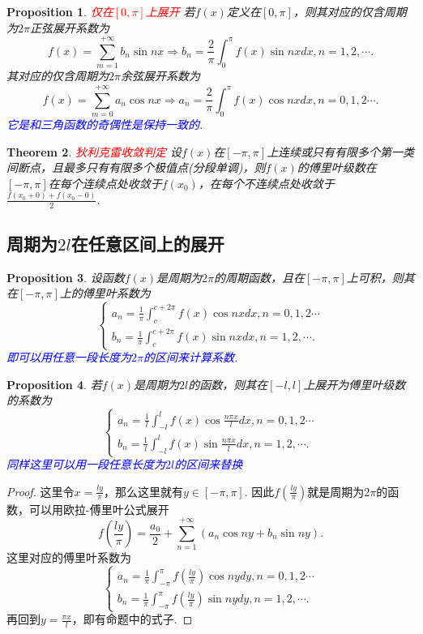 \documentclass{article}
\newtheorem{theorem}{Theorem}[section]
\newtheorem{proposition}[theorem]{Proposition}
\newcommand{\redt}[1]{\textcolor{red}{#1}}
\newcommand{\bluet}[1]{\textcolor{blue}{#1}}
\begin{document}
\begin{proposition}
\rm \redt{仅在$[0,\pi]$上展开} 若$f(x)$定义在$[0,\pi]$，则其对应的仅含周期为$2\pi$正弦展开系数为
$$
f(x) = \sum\limits_{m=1}^{+\infty}b_n\sin nx \Rightarrow b_n = \frac{2}{\pi} \int_{0}^{\pi} f(x)\sin nx dx,n = 1,2,\cdots.
$$
其对应的仅含周期为$2\pi$余弦展开系数为
$$
f(x) = \sum\limits_{m=0}^{+\infty}a_n\cos nx \Rightarrow a_n = \frac{2}{\pi} \int_{0}^{\pi} f(x)\cos nx dx, n = 0,1,2\cdots. 
$$
\bluet{它是和三角函数的奇偶性是保持一致的}.
\end{proposition}

\begin{theorem}
\rm \redt{狄利克雷收敛判定} 设$f(x)$在$[-\pi,\pi]$上连续或只有有限多个第一类间断点，且最多只有有限多个极值点(分段单调)，则$f(x)$的傅里叶级数在$[-\pi,\pi]$在每个连续点处收敛于$f(x_0)$，在每个不连续点处收敛于$\frac{f(x_0 + 0) + f(x_0-0)}{2}$. 
\end{theorem}

\subsection{周期为$2l$在任意区间上的展开}

\begin{proposition}
\rm 设函数$f(x)$是周期为$2\pi$的周期函数，且在$[-\pi,\pi]$上可积，则其在$[-\pi,\pi]$上的傅里叶系数为
$$
\left\{
\begin{array}{ll}
a_n = \frac{1}{\pi} \int_{c}^{c+2\pi} f(x)\cos nxdx, n =  0,1,2\cdots \\
b_n = \frac{1}{\pi} \int_{c}^{c+2\pi} f(x)\sin nxdx, n = 1,2,\cdots.
\end{array} \right.
$$
\bluet{即可以用任意一段长度为$2\pi$的区间来计算系数}.
\end{proposition}

\begin{proposition}
\rm 若$f(x)$是周期为$2l$的函数，则其在$[-l,l]$上展开为傅里叶级数的系数为
$$
\left\{
\begin{array}{ll}
a_n = \frac{1}{l} \int_{-l}^{l} f(x)\cos \frac{n\pi x}{l}dx, n =  0,1,2 \cdots \\
b_n = \frac{1}{l} \int_{-l}^{l} f(x)\sin \frac{n\pi x}{l}dx, n = 1,2,\cdots.
\end{array} \right.
$$
\bluet{同样这里可以用一段任意长度为$2l$的区间来替换}
\end{proposition}

\begin{proof}
\rm 这里令$x=\frac{ly}{\pi}$，那么这里就有$y \in [-\pi,\pi]$. 因此$f(\frac{ly}{\pi})$就是周期为$2\pi$的函数，可以用欧拉-傅里叶公式展开
$$
f\left(\frac{ly}{\pi}\right) = \frac{a_0}{2} + \sum\limits_{n=1}^{+\infty}(a_n\cos ny + b_n \sin ny).  
$$
这里对应的傅里叶系数为
$$
\left\{
\begin{array}{ll}
a_n = \frac{1}{\pi} \int_{-\pi}^{\pi} f\left(\frac{ly}{\pi}\right)\cos nydy, n =  0,1,2\cdots \\
b_n = \frac{1}{\pi} \int_{-\pi}^{\pi} f\left(\frac{ly}{\pi}\right)\sin nydy, n = 1,2,\cdots.
\end{array} \right.
$$
再回到$y = \frac{\pi x}{l}$，即有命题中的式子. 
\end{proof}
\end{document}
